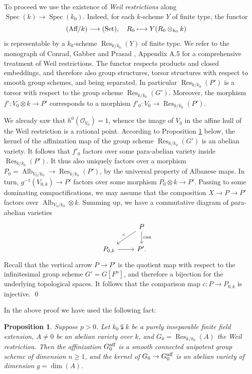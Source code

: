 \documentclass[oneside, 12pt]{amsart}
\newcommand\mylabel[1]{\label{#1}\marginpar{\vspace{-1ex}\medskip\medskip\footnotesize \tt #1}}
\renewcommand\mylabel[1]{\label{#1}}
\newtheorem{proposition}[theorem]{Proposition}
\theoremstyle{definition}
\theoremstyle{remark}
\newcommand{\aff}{\text{\rm aff}}
\newcommand{\Aff}{\text{\rm Aff}}
\newcommand{\Alb}{\operatorname{Alb}}
\newcommand{\can}{\text{\rm  can}}
\newcommand{\lra}{\longrightarrow}
\renewcommand{\O}{\mathscr{O}}
\newcommand{\ra}{\rightarrow}
\newcommand{\Res}{\operatorname{Res}}
\newcommand{\Set}{{\text{\rm Set}}}
\newcommand{\Spec}{\operatorname{Spec}}
\begin{document}
To proceed we use the existence of   \emph{Weil restrictions} along  $\Spec(k)\ra\Spec(k_0)$.
Indeed, for each $k$-scheme  $Y$ of finite type, the functor 
$$
(\Aff/k)\lra (\Set),\quad R_0\longmapsto Y(R_0\otimes_{k_0}k)
$$
is representable by 
a $k_0$-scheme $\Res_{k/k_0}(Y)$ of finite type. We refer to the monograph of Conrad, Gabber and Prasad \cite{Conrad; Gabber; Prasad 2010}, Appendix A.5
for a comprehensive treatment of Weil restrictions.
The functor respects products and closed embeddings, and therefore also group structures, torsor structures with respect to smooth group schemes, and 
being separated.
In particular $\Res_{k/k_0}(P')$ is a torsor with respect to the group scheme $\Res_{k/k_0}(G')$.
Moreover, the morphism $f':V_0\otimes k\ra P'$ corresponds to a  morphism $f'_0:V_0\ra \Res_{k/k_0}(P')$.

We already saw that $h^0(\O_{V_0})=1$, whence the image of $V_0$ in the affine hull of the Weil restriction is a rational point.
According to Proposition \ref{weil restriction} below,  the kernel of the affinization map of the group scheme $\Res_{k/k_0}(G')$ is an abelian variety. 
It follows that $f'_0$ factors over some para-abelian variety inside $\Res_{k/k_0}(P')$.
It thus also uniquely factors over a  morphism $P_0=\Alb_{V_0/k_0}\ra \Res_{k/k_0}(P')$, by the universal property of Albanese maps.
In turn,  $g^{-1}(V_{0,k})\ra P'$ factors over
some morphism $P_0\otimes k\ra P'$.
Passing to some dominating compactifications, we may assume that the composition $X\ra P\ra P'$ factors over $\Alb_{V_0/k_0}\otimes k$.
Summing up, we have a commutative diagram of para-abelian varieties
$$
\begin{tikzcd} 
	&P\ar[dl,"c"']\ar[d,"\can"]\\
P_{0,k}\ar[r]	& P'.
\end{tikzcd}
$$
Recall that the vertical arrow $P\ra P'$ is the quotient map with respect to the infinitesimal group scheme $G'=G[F^n]$,
and therefore a bijection for the underlying topological spaces.
It follows that the comparison map   $c:P\ra P_{0,k}$ is injective.
\qed

\medskip
In the above proof we have used the following fact:

\begin{proposition}
\mylabel{weil restriction}
Suppose $p>0$.
Let $k_0\subsetneqq k$ be a purely inseparable finite field extension, 
$A\neq 0$ be an abelian variety over $k$, and $G_0=\Res_{k/k_0}(A)$ the Weil restriction.
Then the affinization  $G_0^\aff$ is a smooth connected unipotent group scheme of dimension $n\geq 1$,
and the kernel of  $G_0\ra G_0^\aff$ is an abelian variety of dimension $g=\dim(A)$.
\end{proposition}
\end{document}
